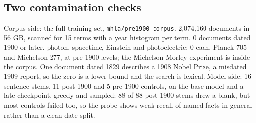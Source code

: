 
\subsection{Two contamination checks}

Corpus side: the full training set, \texttt{mhla/pre1900-corpus}, 2,074,160 documents in 56 GB, scanned for 15 terms with a year histogram per term. 0 documents dated 1900 or later. photon, spacetime, Einstein and photoelectric: 0 each. Planck 705 and Michelson 277, at pre-1900 levels; the Michelson-Morley experiment is inside the corpus. One document dated 1829 describes a 1908 Nobel Prize, a misdated 1909 report, so the zero is a lower bound and the search is lexical. Model side: 16 sentence stems, 11 post-1900 and 5 pre-1900 controls, on the base model and a late checkpoint, greedy and sampled: 88 of 88 post-1900 stems drew a blank, but most controls failed too, so the probe shows weak recall of named facts in general rather than a clean date split.
